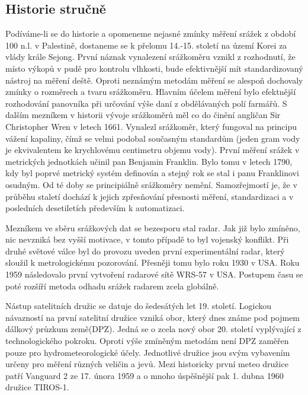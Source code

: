 \documentclass[a4paper,12pt]{article}
\begin{document}
\subsection{Historie stručně}
Podíváme-li se do historie a opomeneme nejasné zmínky měření srážek z období 100 n.l. v Palestině, dostaneme se k přelomu 14.-15. století na území Korei za vlády krále Sejong.\cite{sejong} První náznak vynalezení srážkoměru vznikl z rozhodnutí, že místo výkopů v pudě pro kontrolu vlhkosti, bude efektivnější mít standardizovaný nástroj na měření deště. Oproti neznámým metodám měření se alespoň dochovaly zmínky o rozměrech a tvaru srážkoměru. Hlavním účelem měření bylo efektnější rozhodování panovníka při určování výše daní z obdělávaných polí farmářů. S dalším mezníkem v historii vývoje srážkoměrů měl co do činění angličan Sir Christopher Wren v letech 1661.\cite{wren} Vynalezl srážkoměr, který fungoval na principu vážení kapaliny, čímž se velmi podobal současným standardům (jeden gram vody je ekvivalentem ke krychlovému centimetru objemu vody). První měření srážek v metrických jednotkách učinil pan Benjamin Franklin. Bylo tomu v letech 1790, kdy byl poprvé metrický systém definován a stejný rok se stal i panu Franklinovi osudným. Od té doby se principiálně srážkoměry nemění. Samozřejmostí je, že v průběhu staletí dochází k jejich zpřesňování přesnosti měření, standardizaci a v posledních desetiletích především k automatizaci.

Mezníkem ve sběru srážkových dat se bezesporu stal radar. Jak již bylo zmíněno, nic nevzniká bez vyšší motivace, v tomto případě to byl vojenský konflikt. Při druhé světové válce byl do provozu uveden první experimentální radar, který sloužil k metrologickému pozorování. Přesněji tomu bylo roku 1930 v USA. \cite{flash_floods} Roku 1959 následovalo první vytvoření radarové sítě WRS-57 v USA. Postupem času se poté rozšíří metoda odhadu srážek radarem zcela globálně. 

Nástup satelitních družic se datuje do šedesátých let 19. století. Logickou návazností na první satelitní družice vzniká obor, který dnes známe pod pojmem dálkový průzkum země(DPZ). Jedná se o zcela nový obor 20. století vyplývající z technologického pokroku. Oproti výše zmíněným metodám není DPZ zaměřen pouze pro hydrometeorologické účely. Jednotlivé družice jsou svým vybavením určeny pro měření různých veličin a jevů. Mezi historicky první meteo družice patří Vanguard 2 ze 17. února 1959\cite{vanguard} a o mnoho úspěšnější pak 1. dubna 1960 družice TIROS-1. 
     
\end{document}
